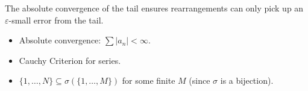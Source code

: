 \begin{remark*}
The absolute convergence of the tail ensures rearrangements can only pick up an $\varepsilon$-small error from the tail.
\end{remark*}

\begin{remark*}[Dependencies]
\begin{itemize}
  \item Absolute convergence: $\sum |a_n| < \infty$.
  \item Cauchy Criterion for series.
  \item $\{1,\ldots,N\} \subseteq \sigma(\{1,\ldots,M\})$ for some finite $M$ (since $\sigma$ is a bijection).
\end{itemize}
\end{remark*}
